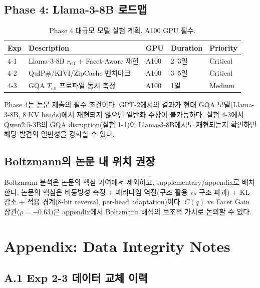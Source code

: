 \documentclass[11pt,a4paper]{article}
\begin{document}
\subsection{Phase 4: Llama-3-8B 로드맵}

\begin{table}[H]
\centering
\caption{Phase 4 대규모 모델 실험 계획. A100 GPU 필수.}
\begin{tabular}{lllll}
\toprule
\textbf{Exp} & \textbf{Description} & \textbf{GPU} & \textbf{Duration} & \textbf{Priority} \\
\midrule
4-1 & Llama-3-8B $r_\mathrm{eff}$ + Facet-Aware 재현 & A100 & 2--3일 & Critical \\
4-2 & QuIP\#/KIVI/ZipCache 벤치마크 & A100 & 3--5일 & Critical \\
4-3 & GQA $T_\mathrm{eff}$ 프로파일 동시 측정 & A100 & 1일 & Medium \\
\bottomrule
\end{tabular}
\end{table}

Phase 4는 논문 제출의 필수 조건이다.
GPT-2에서의 결과가 현대 GQA 모델(Llama-3-8B, 8 KV heads)에서 재현되지 않으면 일반화 주장이 불가능하다.
실험 4-3에서 Qwen2.5-3B의 GQA disruption(실험 1-1)이 Llama-3-8B에서도 재현되는지 확인하면 해당 발견의 일반성을 강화할 수 있다.

\subsection{Boltzmann의 논문 내 위치 권장}

Boltzmann 분석은 논문의 핵심 기여에서 제외하고, supplementary/appendix로 배치한다.
논문의 핵심은 비등방성 측정 + 패러다임 역전(구조 활용 vs 구조 파괴) + KL 감소 + 적용 경계(8-bit reversal, per-head adaptation)이다.
$C(q)$ vs Facet Gain 상관($\rho = -0.63$)은 appendix에서 Boltzmann 해석의 보조적 가치로 논의할 수 있다.

\newpage
\section*{Appendix: Data Integrity Notes}

\subsection*{A.1 Exp 2-3 데이터 교체 이력}
\end{document}
